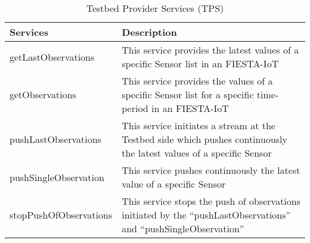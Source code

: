 \begin{table}[ht]
\setlength{\tabcolsep}{3pt}

\begin{center}
\begin{tabular}{|p{3.7cm}|p{8cm}|}
\hline 
\centering Services & \hspace{3.3cm}Description\\
\hline

\centering  getLastObservations & This service provides the latest values of a specific Sensor list in an FIESTA-IoT \\
\hline

\centering  getObservations & This service provides the values of a specific Sensor list for a specific time-period in an FIESTA-IoT \\
\hline

\centering  pushLastObservations & This service initiates a stream at the Testbed side which pushes
continuously the latest values of a specific Sensor \\
\hline

\centering  pushSingleObservation & This service pushes continuously the latest value of a specific Sensor \\
\hline

\centering  stopPushOfObservations & This service stops the push of observations initiated by the
“pushLastObservations” and “pushSingleObservation” \\
\hline

\end{tabular}
\end{center}
\caption{Testbed Provider Services (TPS)}
\label{tab:fiesta_iot_tps_api}
\end{table}
